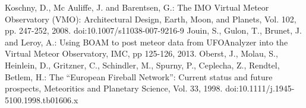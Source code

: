 \documentclass[10pt,twocolumn]{article}
\begin{document}
\begin{thebibliography}{}
Koschny, D., Mc Auliffe, J. and Barentsen, G.: The IMO Virtual Meteor Observatory (VMO): Architectural Design, Earth, Moon, and Planets, Vol. 102, pp. 247-252, 2008. doi:10.1007/s11038-007-9216-9
Jouin, S., Gulon, T., Brunet, J. and Leroy, A.: Using BOAM to post meteor data from UFOAnalyzer into the Virtual Meteor Observatory, IMC, pp 125-126, 2013.
Oberst, J., Molau, S., Heinlein, D., Gritzner, C., Schindler, M., Spurny, P., Ceplecha, Z., Rendtel, Betlem, H.: The ``European Fireball Network'': Current status and future prospects, Meteoritics and Planetary Science, Vol. 33, 1998. doi:10.1111/j.1945-5100.1998.tb01606.x
\end{thebibliography}
\end{document}

